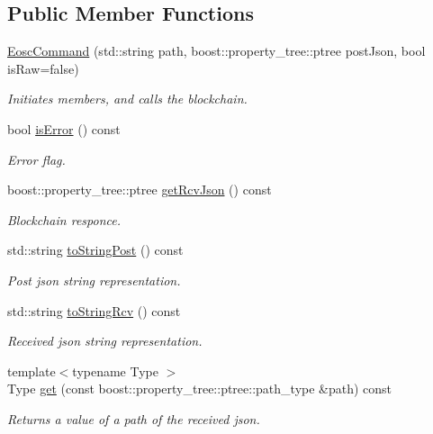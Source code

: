 \subsection*{Public Member Functions}
\begin{DoxyCompactItemize}
\item 
\hyperlink{classtokenika_1_1eosc_1_1_eosc_command_ab736f0dcd8ca14eb0daf9b2244218397}{Eosc\+Command} (std\+::string path, boost\+::property\+\_\+tree\+::ptree post\+Json, bool is\+Raw=false)
\begin{DoxyCompactList}\small\item\em Initiates members, and calls the blockchain. \end{DoxyCompactList}\item 
bool \hyperlink{classtokenika_1_1eosc_1_1_eosc_command_a63f3adace3f84b59f64c5a54ca0c18dc}{is\+Error} () const
\begin{DoxyCompactList}\small\item\em Error flag. \end{DoxyCompactList}\item 
boost\+::property\+\_\+tree\+::ptree \hyperlink{classtokenika_1_1eosc_1_1_eosc_command_a2b451aefc95258d481cff16747fa1888}{get\+Rcv\+Json} () const
\begin{DoxyCompactList}\small\item\em Blockchain responce. \end{DoxyCompactList}\item 
std\+::string \hyperlink{classtokenika_1_1eosc_1_1_eosc_command_a1cb0362dceb5999e7e06078223b20d91}{to\+String\+Post} () const
\begin{DoxyCompactList}\small\item\em Post json string representation. \end{DoxyCompactList}\item 
std\+::string \hyperlink{classtokenika_1_1eosc_1_1_eosc_command_ad01ef46444d9d8bc708b5d18605c3903}{to\+String\+Rcv} () const
\begin{DoxyCompactList}\small\item\em Received json string representation. \end{DoxyCompactList}\item 
{\footnotesize template$<$typename Type $>$ }\\Type \hyperlink{classtokenika_1_1eosc_1_1_eosc_command_aa1da6eb23f52159afa4a15e767cd7d6f}{get} (const boost\+::property\+\_\+tree\+::ptree\+::path\+\_\+type \&path) const
\begin{DoxyCompactList}\small\item\em Returns a value of a path of the received json. \end{DoxyCompactList}\end{DoxyCompactItemize}
